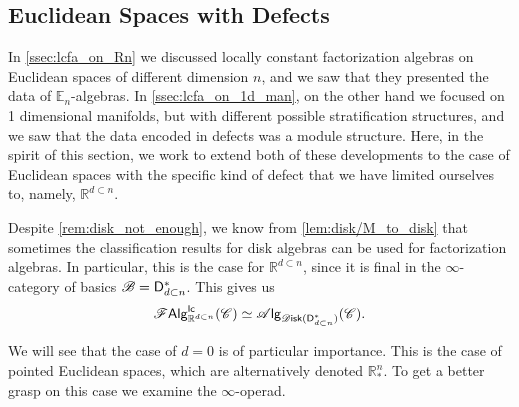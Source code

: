 \documentclass[../text]{subfiles}
\begin{document}
\subsection{Euclidean Spaces with Defects}


In \cref{ssec:lcfa_on_Rn} we discussed locally constant factorization algebras on Euclidean spaces of different dimension $n$, and we saw that they presented the data of $\mathbb{E}_n$-algebras. In \cref{ssec:lcfa_on_1d_man}, on the other hand we focused on 1 dimensional manifolds, but with different possible stratification structures, and we saw that the data encoded in defects was a module structure. Here, in the spirit of this section, we work to extend both of these developments to the case of Euclidean spaces with the specific kind of defect that we have limited ourselves to, namely, $\mathbb{R}^{d \subset n}$.

Despite \cref{rem:disk_not_enough}, we know from \cref{lem:disk/M_to_disk} that sometimes the classification results for disk algebras can be used for factorization algebras. In particular, this is the case for $\mathbb{R}^{d \subset n}$, since it is final in the $\infty$-category of basics $\mathscr{B} = \mathsf{D}_{d \subset n}^*$. This gives us
%
\begin{equation}\label{eq:focus_on_disk_dn}
    \lcfa_{\mathbb{R}^{d \subset n}} (\catC) \simeq \alg{\disk (\mathsf{D}_{d \subset n}^*)} (\catC).
\end{equation}

We will see that the case of $d=0$ is of particular importance. This is the case of pointed Euclidean spaces, which are alternatively denoted $\mathbb{R}^n_*$. To get a better grasp on this case we examine the $\infty$-operad.
\end{document}
